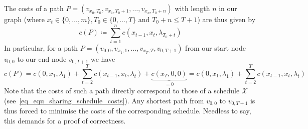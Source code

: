 \documentclass[hidelinks]{article}
\theoremstyle{plain}
\theoremstyle{definition}
\theoremstyle{rem}
\newcommand{\mx}{\mathcal{X}}
\newcommand{\costs}{c}
\newcommand{\fromto}[2]{\{#1,\ldots,#2\}}
\begin{document}
The costs of a path $P=(v_{x_0,T_0},v_{x_1,T_0+1},\ldots,v_{x_n,T_0+n})$ with length $n$ in our graph (where $x_t\in\fromto{0}{m}, T_0\in\fromto{0}{T}$ and $T_0+n\leq T+1$) are thus given by
\begin{equation*}
	\costs(P)\coloneqq\sum\limits_{t=1}^{n}\costs(x_{t-1},x_t,\lambda_{T_0+t})
\end{equation*}
In particular, for a path $P=(v_{0,0},v_{x_1,1},\ldots,v_{x_T,T},v_{0,T+1})$ from our start node $v_{0,0}$ to our end node $v_{0,T+1}$ we have
\begin{equation}
	\costs(P)=\costs(0,x_1,\lambda_1)+\sum\limits_{t=2}^{T}\costs(x_{t-1},x_{t},\lambda_{t})+\underbrace{\costs(x_T,0,0)}_{=0}=\costs(0,x_1,\lambda_1)+\sum\limits_{t=2}^{T}\costs(x_{t-1},x_{t},\lambda_{t})\label{eq_v0_VT1_path_costs}
\end{equation}
Note that the costs of such a path directly correspond to those of a schedule $\mx$ (see~\eqref{eq_equ_sharing_schedule_costs}).
Any shortest path from $v_{0,0}$ to $v_{0,T+1}$ is thus forced to minimise the costs of the corresponding schedule. Needless to say, this demands for a proof of correctness.
\end{document}
